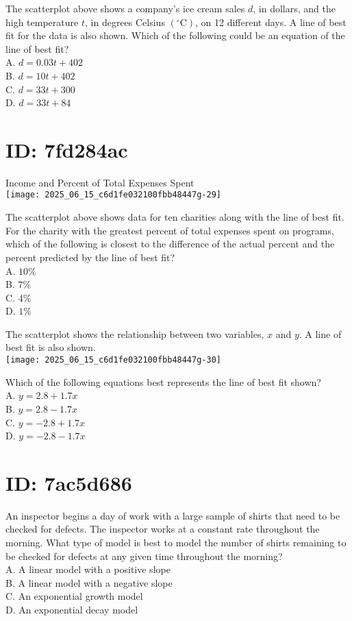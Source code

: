 The scatterplot above shows a company's ice cream sales $d$, in dollars, and the high temperature $t$, in degrees Celsius $\left({ }^{\circ} \mathrm{C}\right)$, on 12 different days. A line of best fit for the data is also shown. Which of the following could be an equation of the line of best fit?\\
A. $d=0.03 t+402$\\
B. $d=10 t+402$\\
C. $d=33 t+300$\\
D. $d=33 t+84$

\section*{ID: 7fd284ac}
Income and Percent of Total Expenses Spent\\
\texttt{[image: 2025\_06\_15\_c6d1fe032100fbb48447g-29]}

The scatterplot above shows data for ten charities along with the line of best fit. For the charity with the greatest percent of total expenses spent on programs, which of the following is closest to the difference of the actual percent and the percent predicted by the line of best fit?\\
A. $10 \%$\\
B. $7 \%$\\
C. $4 \%$\\
D. $1 \%$

The scatterplot shows the relationship between two variables, $x$ and $y$. A line of best fit is also shown.\\
\texttt{[image: 2025\_06\_15\_c6d1fe032100fbb48447g-30]}

Which of the following equations best represents the line of best fit shown?\\
A. $y=2.8+1.7 x$\\
B. $y=2.8-1.7 x$\\
C. $y=-2.8+1.7 x$\\
D. $y=-2.8-1.7 x$

\section*{ID: 7ac5d686}
An inspector begins a day of work with a large sample of shirts that need to be checked for defects. The inspector works at a constant rate throughout the morning. What type of model is best to model the number of shirts remaining to be checked for defects at any given time throughout the morning?\\
A. A linear model with a positive slope\\
B. A linear model with a negative slope\\
C. An exponential growth model\\
D. An exponential decay model


